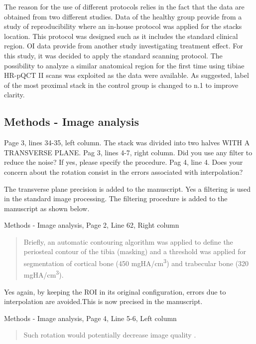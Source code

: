 \documentclass{AR2RC}
\begin{document}
\AR The reason for the use of different protocols relies in the fact that the data are obtained from two different studies. Data of the healthy group provide from a study of reproducibility where an in-house protocol was applied for the stacks location. This protocol was designed such as it includes the standard clinical region. OI data provide from another study investigating treatment effect. For this study, it was decided to apply the standard scanning protocol. The possibility to analyze a similar anatomical region for the first time using tibiae HR-pQCT II scans was exploited as the data were available. As suggested, label of the most proximal stack in the control group is changed to n.1 to improve clarity.

\subsection{Methods - Image analysis}
\RC Page 3, lines 34-35, left column. The stack was divided into two halves WITH A TRANSVERSE PLANE. Pag 3, lines 4-7, right column. Did you use any filter to reduce the noise? If yes, please specify the procedure. Pag 4, line 4. Does your concern about the rotation consist in the errors associated with interpolation?

\AR The transverse plane precision is added to the manuscript. Yes a filtering is used in the standard image processing. The filtering procedure is added to the manuscript as shown below.\par

Methods - Image analysis, Page 2, Line 62, Right column
\begin{quote}
	Briefly, an automatic contouring algorithm was applied to define the periosteal contour of the tibia (masking) and a threshold was applied for segmentation of cortical bone (450 mgHA/cm\textsuperscript{3}) and trabecular bone (320 mgHA/cm\textsuperscript{3}).
\end{quote}

Yes again, by keeping the ROI in its original configuration, errors due to interpolation are avoided.This is now precised in the manuscript.\par

Methods - Image analysis, Page 4, Line 5-6, Left column
\begin{quote}
	Such rotation would potentially decrease image quality .
\end{quote}
\end{document}
